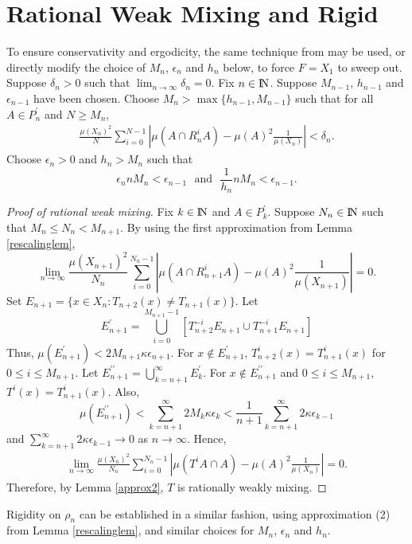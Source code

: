 \documentclass[12pt]{amsart}
\begin{document}
\section{Rational Weak Mixing and Rigid} 
\label{main1}
To ensure conservativity and ergodicity, 
the same technique from \cite{Towerplex1} 
may be used, or directly modify the choice 
of $M_n$, $\epsilon_n$ and $h_n$ below, to force $F=X_1$ to sweep out. 
Suppose $\delta_n > 0$ such that $\lim_{n\to \infty} \delta_n = 0$. 
Fix $n\in {\hbox{\rm\setbox1=\hbox{I}\copy1\kern-.45\wd1 N}}$. 
Suppose $M_{n-1}$, $h_{n-1}$ and $\epsilon_{n-1}$ have been chosen. 
Choose $M_n > \max{ \{ h_{n-1}, M_{n-1} \} }$ such that 
for all $A\in P_n^{\prime}$ and $N \geq M_n$, 
\begin{eqnarray}
\frac{\mu(X_n)^2}{N} \sum_{i=0}^{N-1} 
| \mu(A\cap R_n^iA) - \mu(A)^2\frac{1}{\mu(X_n)} | < \delta_n . \label{cond1}
\end{eqnarray} 
Choose $\epsilon_n > 0$ and $h_n > M_n$ such that 
\[
\epsilon_n n M_n < \epsilon_{n-1} \ \ \ \mbox{and}\ \ \ 
\frac{1}{h_n} n M_n < \epsilon_{n-1} . 
\]
\begin{proof}[Proof of rational weak mixing] 
Fix $k\in {\hbox{\rm\setbox1=\hbox{I}\copy1\kern-.45\wd1 N}}$ and $A\in P_k^{\prime}$. 
Suppose $N_n \in {\hbox{\rm\setbox1=\hbox{I}\copy1\kern-.45\wd1 N}}$ such that $M_n \leq N_n < M_{n+1}$. 
By using the first approximation from Lemma \ref{rescalinglem}, 
\[
\lim_{n\to \infty} \frac{\mu(X_{n+1})^2}{N_n} \sum_{i=0}^{{N_n} - 1} | \mu(A\cap R_{n+1}^iA) 
- \mu(A)^2\frac{1}{\mu(X_{n+1})} | = 0 . 
\] 
Set $E_{n+1}=\{x\in X_n: T_{n+2}(x)\neq T_{n+1}(x)\}$. Let 
$$E_{n+1}^{\prime}=\bigcup_{i=0}^{M_{n+1}-1}[T_{n+2}^{-i}E_{n+1}\cup T_{n+1}^{-i}E_{n+1}]$$
Thus, $\mu (E_{n+1}^{\prime}) < 2M_{n+1} \kappa \epsilon_{n+1}$. 
For $x\notin E_{n+1}^{\prime}$, $T_{n+2}^i(x)=T_{n+1}^i(x)$ for $0\leq i\leq M_{n+1}$. 
Let $E_{n+1}^{\prime\prime} = \bigcup_{k=n+1}^{\infty}E_k^{\prime}$. 
For $x\notin E_{n+1}^{\prime\prime}$ and $0\leq i\leq M_{n+1}$, 
$T^i(x) = T_{n+1}^i(x)$. 
Also,
$$\mu (E_{n+1}^{\prime\prime} ) < \sum_{k=n+1}^{\infty} 2M_{k}\kappa \epsilon_k 
< \frac{1}{n+1}\sum_{k=n+1}^{\infty}2\kappa \epsilon_{k-1}$$
and $\sum_{k=n+1}^{\infty}2\kappa \epsilon_{k-1} \to 0$ as $n\to \infty$. 
Hence, 
\begin{eqnarray*}
\lim_{n\to \infty} \frac{\mu(X_n)^2}{N_n}\sum_{i=0}^{{N_n}-1} 
| \mu (T^iA\cap A) - \mu (A)^2 \frac{1}{\mu(X_n)} | = 0 . 
\end{eqnarray*}
Therefore, by Lemma \ref{approx2}, 
$T$ is rationally weakly mixing. 
\end{proof} 
Rigidity on $\rho_n$ can be established in a similar fashion, 
using approximation (2) from Lemma \ref{rescalinglem}, 
and similar choices for $M_n$, $\epsilon_n$ and $h_n$. 
\end{document}
